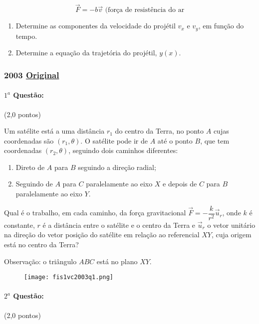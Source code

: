 \documentclass[12pt,a4paper]{article}
\newcommand{\original}[1]{\tiny \href{#1}{Original} \normalsize}
\begin{document}
$$ \overrightarrow{F}=-b\overrightarrow{v} \textrm{ (força de resistência do ar} $$

\begin{enumerate}[label=\alph*)]
\item Determine as componentes da velocidade do projétil $v_x$ e $v_y$, em função do tempo.
\item Determine a equação da trajetória do projétil, $y(x)$.
\end{enumerate}
\newpage

\subsubsection{2003 \original{https://drive.google.com/file/d/1DHYVV8VAxas7WYdZjn7KfkgFQ6bv0rQq/view?usp=sharing}}

\paragraph{$1^a$ Questão:} (2,0 pontos)

Um satélite está a uma distância $r_1$ do centro da Terra, no ponto $A$ cujas coordenadas são $(r_1,\theta)$. O satélite
pode ir de $A$ até o ponto $B$, que tem coordenadas $(r_2,\theta)$, seguindo dois caminhos diferentes:
\begin{enumerate}[label=\roman*)]
\item Direto de $A$ para $B$ seguindo a direção radial;
\item Seguindo de $A$ para $C$ paralelamente ao eixo $X$ e depois de $C$ para $B$ paralelamente ao eixo $Y$.  
\end{enumerate}
Qual é o trabalho, em cada caminho, da força gravitacional $\overrightarrow{F}=-\dfrac{k}{r^2}\overrightarrow{u}_r$, onde 
$k$ é constante, $r$ é a distância entre o satélite e o centro da Terra e $\overrightarrow{u}_r$ o vetor unitário na direção 
do vetor posição do satélite em relação ao referencial $XY$, cuja origem está no centro da Terra?

Observação: o triângulo $ABC$ está no plano $XY$.

\begin{figure}[ht]
\centering
\texttt{[image: fis1vc2003q1.png]}
\end{figure}

\paragraph{$2^a$ Questão:} (2,0 pontos)
\end{document}

